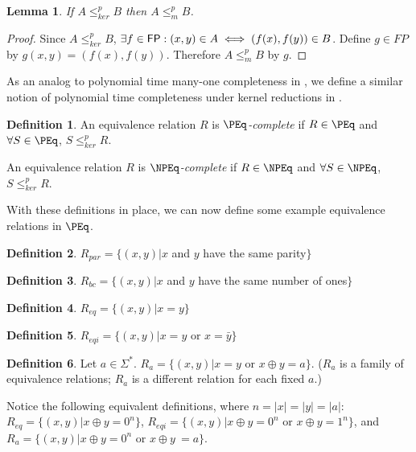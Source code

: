 \documentclass{article}
\newtheorem{lemma}{Lemma}%
\theoremstyle{definition}
\newtheorem{definition}{Definition}%
\newcommand{\sigmastar}{\Sigma^{*}}
\newcommand{\kr}{\leq^{p}_{ker}} %
\newcommand{\mor}{\leq^{p}_{m}} %
\begin{document}
\begin{lemma}\label{lem:kr_mor}If $A\kr B$ then $A\mor B$.\end{lemma}
\begin{proof}
  Since $A\kr B$, $\exists f\in{\ensuremath{\mathsf{FP}}}: (x,y)\in A\iff(f(x), f(y))\in B$. Define
  $g\in FP$ by $g(x,y)=(f(x), f(y))$. Therefore $A\mor B$ by $g$.
\end{proof}

As an analog to polynomial time many-one completeness in \NP, we define a
similar notion of polynomial time completeness under kernel reductions in
\NPEq.

\begin{definition}\label{def:kernel_complete}
  An equivalence relation $R$ is \textit{$\PEq$-complete} if $R\in\PEq$ and
  $\forall S\in\PEq$, $S\kr R$.

  An equivalence relation $R$ is \textit{$\NPEq$-complete} if $R\in\NPEq$ and
  $\forall S\in\NPEq$, $S\kr R$.
\end{definition}

With these definitions in place, we can now define some example equivalence
relations in $\PEq$.

\begin{definition}
  $R_{par}=\{(x, y)|x$ and $y$ have the same parity$\}$
\end{definition}

\begin{definition}
  $R_{bc}=\{(x, y)|x$ and $y$ have the same number of ones$\}$
\end{definition}

\begin{definition}
  $R_{eq}=\{(x, y)|x=y\}$
\end{definition}

\begin{definition}
  $R_{eqi}=\{(x, y)|x=y$ or $x=\bar{y}\}$
\end{definition}

\begin{definition}
  Let $a\in\sigmastar$. $R_{a}=\{(x,y)|x=y$ or $x\oplus y=a\}$. ($R_{a}$ is a
  family of equivalence relations; $R_{a}$ is a different relation for each
  fixed $a$.)
\end{definition}

Notice the following equivalent definitions, where $n=|x|=|y|=|a|$:
$R_{eq}=\{(x, y)|x \oplus y = 0^n\}$, $R_{eqi}=\{(x, y)|x \oplus y = 0^n$ or
$x\oplus y = 1^n\}$, and $R_{a}=\{(x,y)|x \oplus y = 0^n$ or $x \oplus y\ =
a\}$.
\end{document}
